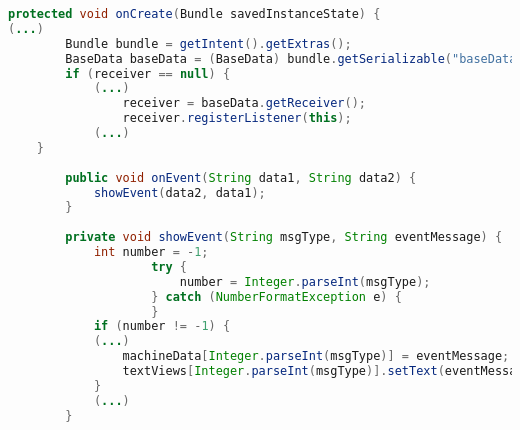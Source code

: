 \label{appCode:klasseMachineData}
\begin{lstlisting}[language=java, caption=Klasse MachineData]
    protected void onCreate(Bundle savedInstanceState) {
(...)
        Bundle bundle = getIntent().getExtras();
        BaseData baseData = (BaseData) bundle.getSerializable("baseData");
        if (receiver == null) {
            (...)
                receiver = baseData.getReceiver();
                receiver.registerListener(this);
            (...)
    }
    
        public void onEvent(String data1, String data2) {
            showEvent(data2, data1);
        }
        
        private void showEvent(String msgType, String eventMessage) {
            int number = -1;
                    try {
                        number = Integer.parseInt(msgType);
                    } catch (NumberFormatException e) {
                    }
            if (number != -1) {
            (...)
                machineData[Integer.parseInt(msgType)] = eventMessage;
                textViews[Integer.parseInt(msgType)].setText(eventMessage);
            } 
            (...)
        }

\end{lstlisting}
